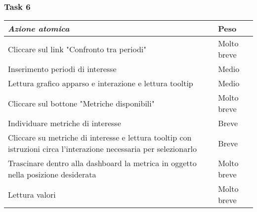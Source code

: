 \subsubsection{Task 6}
\label{sss:iaa-task-6}

{
\renewcommand{\arraystretch}{2}
\begin{longtable}[h]{| p{14cm} | p{2.5cm} |}
    \hline
    \textit{Azione atomica} & \textbf{Peso} \\
    \hline
    \endhead
    Cliccare sul link "Confronto tra periodi" & Molto breve \\
    \hline
    Inserimento periodi di interesse & Medio  \\
    \hline
    Lettura grafico apparso e interazione e lettura tooltip & Medio \\
    \hline
    Cliccare sul bottone "Metriche disponibili" & Molto breve \\
    \hline
    Individuare metriche di interesse & Breve \\
    \hline
    Cliccare su metriche di interesse e lettura tooltip con istruzioni circa l'interazione necessaria per selezionarlo & Breve \\
    \hline
    Trascinare dentro alla dashboard la metrica in oggetto nella posizione desiderata & Molto breve \\
    \hline
    Lettura valori & Molto breve \\
    \hline
\end{longtable}
}
